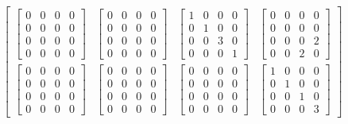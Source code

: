 \documentclass[twocolumn,10pt]{asme2ej}
\begin{document}
\begin{equation}
\begin{bmatrix}
        \begin{bmatrix} 0 & 0 & 0 & 0 \\ 0 & 0 & 0 & 0 \\ 0 & 0 & 0 & 0 \\ 0 & 0 & 0 & 0 \end{bmatrix} &
        \begin{bmatrix} 0 & 0 & 0 & 0 \\ 0 & 0 & 0 & 0 \\ 0 & 0 & 0 & 0 \\ 0 & 0 & 0 & 0 \end{bmatrix} &
        \begin{bmatrix} 1 & 0 & 0 & 0 \\ 0 & 1 & 0 & 0 \\ 0 & 0 & 3 & 0 \\ 0 & 0 & 0 & 1 \end{bmatrix} &
        \begin{bmatrix}0 & 0 & 0 & 0 \\ 0 & 0 & 0 & 0 \\ 0 & 0 & 0 & 2 \\ 0 & 0 & 2 & 0 \end{bmatrix} \\
          \begin{bmatrix} 0 & 0 & 0 & 0 \\ 0 & 0 & 0 & 0 \\ 0 & 0 & 0 & 0 \\ 0 & 0 & 0 & 0 \end{bmatrix} &
          \begin{bmatrix} 0 & 0 & 0 & 0 \\ 0 & 0 & 0 & 0 \\ 0 & 0 & 0 & 0 \\ 0 & 0 & 0 & 0 \end{bmatrix} &
          \begin{bmatrix} 0 & 0 & 0 & 0 \\ 0 & 0 & 0 & 0 \\ 0 & 0 & 0 & 0 \\ 0 & 0 & 0 & 0 \end{bmatrix} &
          \begin{bmatrix}1 & 0 & 0 & 0 \\ 0 & 1 & 0 & 0 \\ 0 & 0 & 1 & 0 \\ 0 & 0 & 0 & 3 \end{bmatrix} \end{bmatrix}
\label{_eq_quadlambda}
\end{equation}
\end{document}
